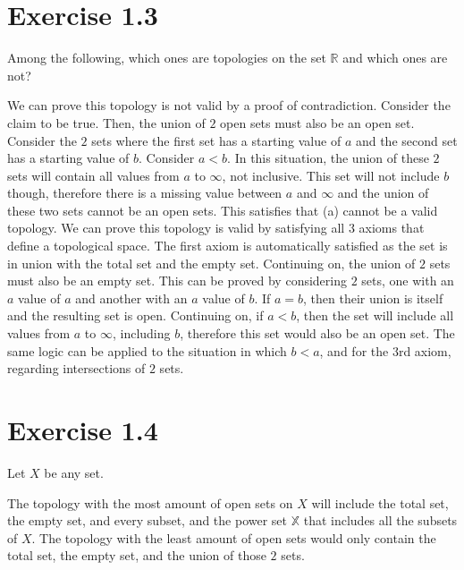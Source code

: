 \documentclass{report}
\begin{document}
\section{Exercise 1.3}
\begin{center}
    Among the following, which ones are topologies on the set $\mathbb{R}$ and which ones are not?
\end{center}

\bigskip
\sol We can prove this topology is not valid by a proof of contradiction. Consider the claim to be true. Then, the union of $2$ open sets must also be an open set. Consider the $2$ sets where the first set has a starting value of $a$ and the second set has a starting value of $b$. Consider $a < b$. In this situation, the union of these $2$ sets will contain all values from $a$ to $\infty$, not inclusive. This set will not include $b$ though, therefore there is a missing value between $a$ and $\infty$ and the union of these two sets cannot be an open sets. This satisfies that (a) cannot be a valid topology. 
\qs{1.3.b}{\[\tau = \{[a, \infty) \mid a \in \mathbb{R}\} \cup \{\phi, \mathbb{R}\}\].} 
\bigskip
\sol We can prove this topology is valid by satisfying all $3$ axioms that define a topological space. The first axiom is automatically satisfied as the set is in union with the total set and the empty set. Continuing on, the union of $2$ sets must also be an empty set. This can be proved by considering $2$ sets, one with an $a$ value of $a$ and another with an $a$ value of $b$. If $a = b$, then their union is itself and the resulting set is open. Continuing on, if $a < b$, then the set will include all values from $a$ to $\infty$, including $b$, therefore this set would also be an open set. The same logic can be applied to the situation in which $b < a$, and for the $3$rd axiom, regarding intersections of $2$ sets. 


\section{Exercise 1.4}
\begin{center}
Let $X$ be any set. 
\end{center}

\bigskip
\sol The topology with the most amount of open sets on $X$ will include the total set, the empty set, and every subset, and the power set $\mathbb{X}$ that includes all the subsets of $X$. 
\bigskip
{}
\bigskip
\sol The topology with the least amount of open sets would only contain the total set, the empty set, and the union of those $2$ sets.  
\newpage
\end{document}
